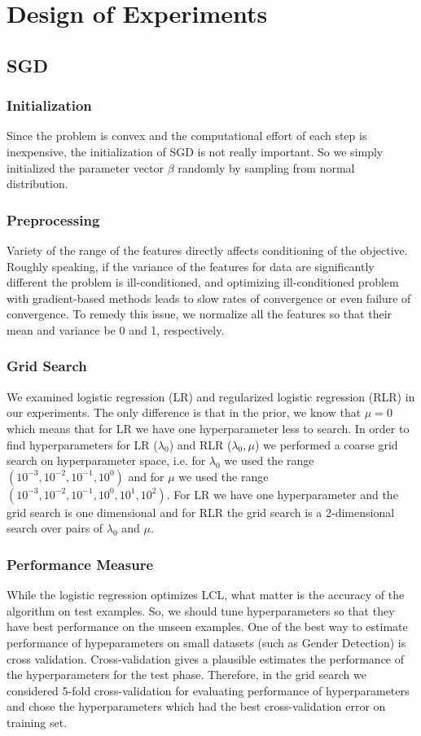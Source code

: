 \documentclass[twoside,12pt]{article}
\begin{document}
\section{Design of Experiments}
\subsection{SGD}
\subsubsection{Initialization}
Since the problem is convex and the computational effort of each step is inexpensive, the initialization of SGD is not really important. So we simply initialized the parameter vector $\beta$ randomly by sampling from normal distribution. 

\subsubsection{Preprocessing}
Variety of the range of the features directly affects conditioning of the objective. Roughly speaking, if the variance of the features for data are significantly different the problem is ill-conditioned, and optimizing ill-conditioned problem with gradient-based methods leads to slow rates of convergence or even failure of convergence. To remedy this issue, we normalize all the features so that their mean and variance be 0 and 1, respectively.

\subsubsection{Grid Search}
We examined logistic regression (LR) and regularized logistic regression (RLR) in our experiments. The only difference is that in the prior, we know that $\mu=0$ which means that for LR we have one hyperparameter less to search. In order to find hyperparameters for LR ($\lambda_0$) and RLR ($\lambda_0,\mu$) we performed a coarse grid search on hyperparameter space, i.e. for $\lambda_0$ we used the range $(10^{-3}, 10^{-2}, 10^{-1}, 10^{0})$ and for $\mu$ we used the range $(10^{-3}, 10^{-2}, 10^{-1}, 10^{0}, 10^{1}, 10^{2} )$. For LR we have one hyperparameter and the grid search is one dimensional and for RLR the grid search is a 2-dimensional search over pairs of $\lambda_0 $ and $\mu$.

\subsubsection{Performance Measure}
While the logistic regression optimizes LCL, what matter is the accuracy of the algorithm on test examples. So, we should tune hyperparameters so that they have best performance on the unseen examples. One of the best way to estimate performance of hypeparameters on small datasets (such as Gender Detection) is cross validation. Cross-validation gives a plausible estimates the performance of the hyperparameters for the test phase. Therefore, in the grid search we considered 5-fold cross-validation for evaluating performance of hyperparameters and chose the hyperparameters which had the best cross-validation error on training set.
\end{document}
